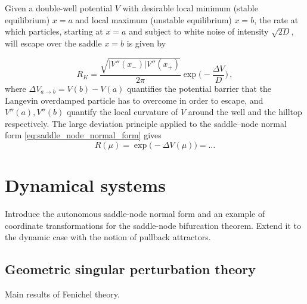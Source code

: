 Given a double-well potential $V$ with desirable local minimum (stable equilibrium) $x=a$ and local maximum (unstable equilibrium) $x=b$, the rate at which particles, starting at $x=a$ and subject to white noise of intensity $\sqrt{2D}$, will escape over the saddle $x=b$ is given by
 
\begin{equation}\label{eq:kramer_escape_formula}
        R_{K} = \frac{\sqrt{|V''(x_-)|V''(x_+)}}{2\pi}\exp\bigg(-\frac{\Delta V}{D}\bigg)\,,
\end{equation}
%
where $\Delta V_{a\to b} = V(b) - V(a)$ quantifies the potential barrier that the Langevin overdamped particle has to overcome in order to escape, and $V''(a),V''(b)$ quantify the local curvature of $V$ around the well and the hilltop respectively.
%
The large deviation principle applied to the saddle--node normal form \eqref{eq:saddle_node_normal_form} gives
%
\begin{equation}\label{eq:ldp_saddle_node}
  R(\mu) = \exp\bigl(-\Delta V(\mu)\bigr) = \dots
\end{equation}

\section{Dynamical systems}\label{sec:dynamical_systems}
Introduce the autonomous saddle-node normal form and an example of coordinate transformations for the saddle-node bifurcation theorem.
Extend it to the dynamic case with the notion of pullback attractors.

\subsection{Geometric singular perturbation theory}\label{subsubsec:gspt}
Main results of Fenichel theory.
